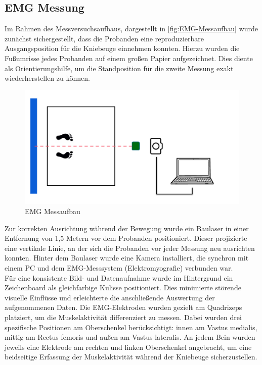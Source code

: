 \subsection{EMG Messung}
Im Rahmen des Messversuchsaufbaus, dargestellt in \autoref{fig:EMG-Messaufbau} wurde zunächst sichergestellt, dass die Probanden eine reproduzierbare Ausgangsposition für die Kniebeuge einnehmen konnten.
Hierzu wurden die Fußumrisse jedes Probanden auf einem großen Papier aufgezeichnet.
Dies diente als Orientierungshilfe, um die Standposition für die zweite Messung exakt wiederherstellen zu können.
\begin{figure}[h!]
    \centering
    \includegraphics[width=0.8\linewidth]{img/Aufbau-EMG.png}
    \caption{EMG Messaufbau}
    \label{fig:EMG-Messaufbau}
\end{figure}
Zur korrekten Ausrichtung während der Bewegung wurde ein Baulaser in einer Entfernung von 1,5 Metern vor dem Probanden positioniert.
Dieser projizierte eine vertikale Linie, an der sich die Probanden vor jeder Messung neu ausrichten konnten.
Hinter dem Baulaser wurde eine Kamera installiert, die synchron mit einem PC und dem EMG-Messsystem (Elektromyografie) verbunden war.
\\
Für eine konsistente Bild- und Datenaufnahme wurde im Hintergrund ein Zeichenboard als gleichfarbige Kulisse positioniert.
Dies minimierte störende visuelle Einflüsse und erleichterte die anschließende Auswertung der aufgenommenen Daten.
Die EMG-Elektroden wurden gezielt am Quadrizeps platziert, um die Muskelaktivität differenziert zu messen.
Dabei wurden drei spezifische Positionen am Oberschenkel berücksichtigt:
innen am Vastus medialis, mittig am Rectus femoris und außen am Vastus lateralis.
An jedem Bein wurden jeweils eine Elektrode am rechten und linken Oberschenkel angebracht, um eine beidseitige Erfassung der Muskelaktivität während der Kniebeuge sicherzustellen.
